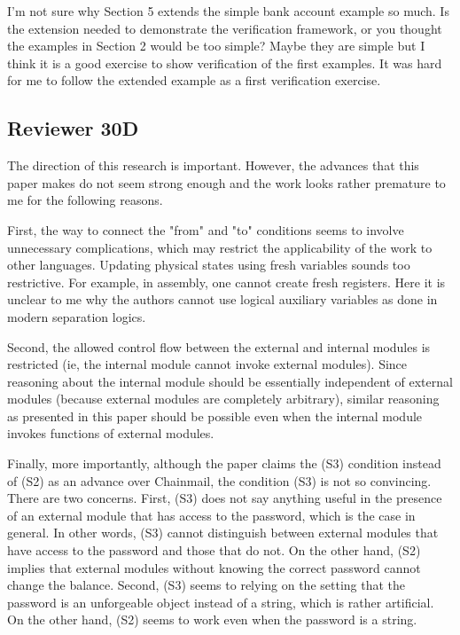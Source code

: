\documentclass[11pt]{amsart}
\begin{document}
I'm not sure why Section 5 extends the simple bank account example so
much.  Is the extension needed to demonstrate the verification
framework, or you thought the examples in Section 2 would be too simple? 
Maybe they are simple but I think it is a good exercise to show verification of the first examples. 
It was hard for me to follow the extended example as a first verification exercise.

 \subsection*{Reviewer 30D}
 
The direction of this research is important. However, the advances that this paper makes do not seem strong enough and the work looks rather premature to me for the following reasons.

First, the way to connect the "from" and "to" conditions seems to involve unnecessary complications, which may restrict the applicability of the work to other languages. Updating physical states using fresh variables sounds too restrictive. For example, in assembly, one cannot create fresh registers. Here it is unclear to me why the authors cannot use logical auxiliary variables as done in modern separation logics.

Second, the allowed control flow between the external and internal modules is restricted (ie, the internal module cannot invoke external modules). Since reasoning about the internal module should be essentially independent of external modules (because external modules are completely arbitrary), similar reasoning as presented in this paper should be possible even when the internal module invokes functions of external modules.

Finally, more importantly, although the paper claims the (S3) condition instead of (S2) as an advance over Chainmail, the condition (S3) is not so convincing. There are two concerns. First, (S3) does not say anything useful in the presence of an external module that has access to the password, which is the case in general. In other words, (S3) cannot distinguish between external modules that have access to the password and those that do not. On the other hand, (S2) implies that external modules without knowing the correct password cannot change the balance. Second, (S3) seems to relying on the setting that the password is an unforgeable object instead of a string, which is rather artificial. On the other hand, (S2) seems to work even when the password is a string.



 
\end{document}
